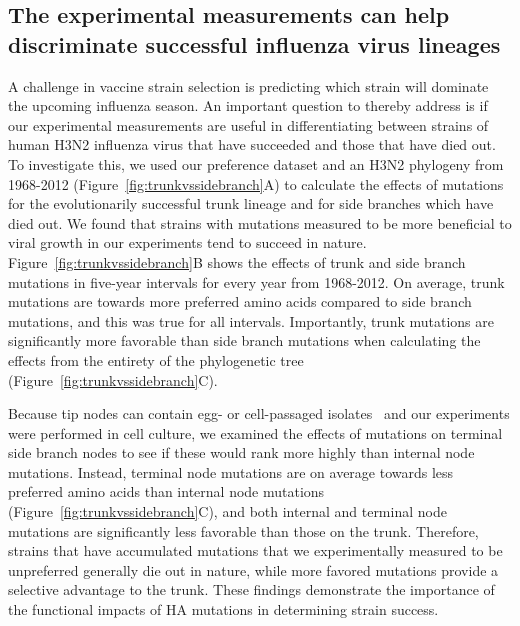 \documentclass[9pt,twocolumn,twoside]{pnas-new}
\begin{document}
\subsection*{The experimental measurements can help discriminate successful influenza virus lineages}
A challenge in vaccine strain selection is predicting which strain will dominate the upcoming influenza season.
An important question to thereby address is if our experimental measurements are useful in differentiating between strains of human H3N2 influenza virus that have succeeded and those that have died out.
To investigate this, we used our preference dataset and an H3N2 phylogeny from 1968-2012 (Figure~\ref{fig:trunkvssidebranch}A) to calculate the effects of mutations for the evolutionarily successful trunk lineage and for side branches which have died out.
We found that strains with mutations measured to be more beneficial to viral growth in our experiments tend to succeed in nature.
Figure~\ref{fig:trunkvssidebranch}B shows the effects of trunk and side branch mutations in five-year intervals for every year from 1968-2012. 
On average, trunk mutations are towards more preferred amino acids compared to side branch mutations, and this was true for all intervals.
Importantly, trunk mutations are significantly more favorable than side branch mutations when calculating the effects from the entirety of the phylogenetic tree (Figure~\ref{fig:trunkvssidebranch}C).

Because tip nodes can contain egg- or cell-passaged isolates~\citep{wu2017structural,mcwhite2016sequence,skowronski2016mutations} and our experiments were performed in cell culture, we examined the effects of mutations on terminal side branch nodes to see if these would rank more highly than internal node mutations.
Instead, terminal node mutations are on average towards less preferred amino acids than internal node mutations (Figure~\ref{fig:trunkvssidebranch}C), and both internal and terminal node mutations are significantly less favorable than those on the trunk.
Therefore, strains that have accumulated mutations that we experimentally measured to be unpreferred generally die out in nature, while more favored mutations provide a selective advantage to the trunk.
These findings demonstrate the importance of the functional impacts of HA mutations in determining strain success.
\end{document}
